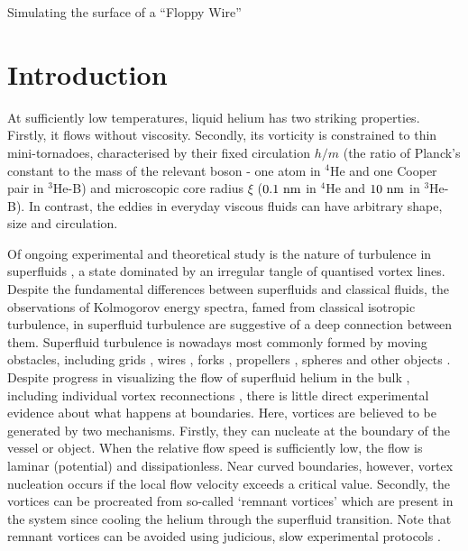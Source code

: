 \begin{chapter}{\label{cha:afm}Simulating the surface of a ``Floppy Wire''}
\section{Introduction}
At sufficiently low temperatures, liquid helium has two striking
properties.  Firstly, it flows without viscosity.  Secondly,
its vorticity is constrained to
thin mini-tornadoes, characterised by their fixed circulation
$h/m$ (the ratio of Planck's constant to
the mass of the relevant boson - one atom in $^4$He and one Cooper pair 
in $^3$He-B) and microscopic core radius $\xi$ 
($0.1~\rm nm$ in $^4$He and $10~\rm nm$ in $^3$He-B).  
In contrast, the eddies in everyday viscous fluids can have arbitrary shape, 
size and circulation.  

Of ongoing experimental and theoretical study is the nature of 
turbulence in superfluids 
\cite{Barenghi-PNAS,Bradley2011-NatPhys,Zmeev2015a,Boue2013}, a state 
dominated by an irregular tangle of quantised vortex lines.  Despite the fundamental differences between superfluids and classical fluids, the observations of Kolmogorov energy spectra, famed from classical isotropic turbulence, in superfluid turbulence \cite{Barenghi-PNAS} are suggestive of a deep connection between them.  Superfluid turbulence is nowadays most commonly formed by moving obstacles, including grids \cite{Davis2000}, wires \cite{Guenault1986,Bradley2005,Bradley2011,Fisher2001}, forks \cite{Blaauwgeers2007,Bradley2012}, propellers \cite{Tabeling1998,Salort2010}, spheres \cite{Schoepe1995} and other objects \cite{VinenSkrbek2008}.
Despite progress in visualizing the flow of superfluid helium in the
bulk \cite{Zmeev2015b,Duda2015}, including individual vortex reconnections
\cite{Lathrop}, there is little direct experimental evidence
about what happens at boundaries.
Here, 
vortices are believed to be generated by two mechanisms.  Firstly, 
they can nucleate at the boundary of the vessel or object.  
When the relative flow speed is sufficiently low, the flow is laminar 
{(potential)} and dissipationless.  
{Near curved boundaries, however, vortex nucleation occurs if
the local flow velocity exceeds a critical value.} 
Secondly, the vortices can be procreated from so-called `remnant vortices' 
which are present in the system since cooling the helium through the superfluid transition.  Note that remnant vortices can be avoided using judicious, slow experimental protocols \cite{Yano-2007}. 



\end{chapter}
